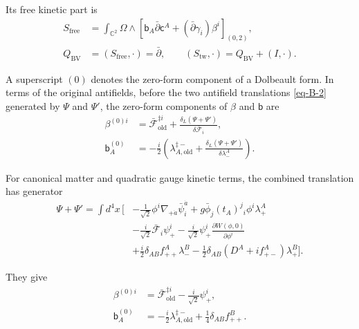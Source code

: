 \documentclass[11pt]{article}
\numberwithin{equation}{section}
\numberwithin{figure}{section}
\numberwithin{table}{section}
\begin{document}
Its free kinetic part is
\begin{equation}\label{eq-BV-free-action}
\begin{aligned}
S_{\mathrm{free}}&=\int_{\mathbb C^2}\Omega\wedge
[\mathsf b_A\bar\partial\mathsf c^A+(\bar\partial\gamma_i)\beta^i]_{(0,2)},\\
Q_{\mathrm{BV}}&=(S_{\mathrm{free}},\cdot)=\bar\partial,
\qquad (S_{\mathrm{tw}},\cdot)=Q_{\mathrm{BV}}+(I,\cdot).
\end{aligned}
\end{equation}

A superscript $(0)$ denotes the zero-form component of a Dolbeault form. In terms of the original antifields, before the two antifield translations \eqref{eq-B-2} generated by $\Psi$ and $\Psi'$, the zero-form components of $\beta$ and $\mathsf b$ are
\begin{equation}\label{eq-B-11}
\begin{aligned}
\beta^{(0)i}
&=\bar{\mathcal F}_{\mathrm{old}}^{\ddagger i}
+\frac{\delta_L(\Psi+\Psi')}{\delta\bar{\mathcal F}_i},\\
\mathsf b_A^{(0)}
&=-\frac i2\left(
\lambda_{A,\mathrm{old}}^{\ddagger-}
+\frac{\delta_L(\Psi+\Psi')}{\delta\lambda_-^A}\right).
\end{aligned}
\end{equation}

For canonical matter and quadratic gauge kinetic terms, the combined translation has generator
\begin{equation}\label{eq-B-12}
\begin{aligned}
\Psi+\Psi'=\int d^4x\,\Big[
&-\frac1{\sqrt2}\phi^i\nabla_{+\dot a}\bar\psi_i^{\dot a}
+g\bar\phi_j(t_A)^j{}_i\phi^i\lambda_+^A\\
&-\frac i{\sqrt2}\bar{\mathcal F}_i\psi_+^i
-\frac i{\sqrt2}\psi_+^i\frac{\partial W(\phi,0)}{\partial\phi^i}\\
&+\frac i2\delta_{AB}f_{++}^A\lambda_-^B
-\frac12\delta_{AB}(D^A+if_{+-}^A)\lambda_+^B\Big].
\end{aligned}
\end{equation}

They give
\begin{equation}\label{eq-B-13}
\begin{aligned}
\beta^{(0)i}
&=\bar{\mathcal F}_{\mathrm{old}}^{\ddagger i}
-\frac i{\sqrt2}\psi_+^i,\\
\mathsf b_A^{(0)}
&
=-\frac i2\lambda_{A,\mathrm{old}}^{\ddagger-}
+\frac14\delta_{AB}f_{++}^B.
\end{aligned}
\end{equation}
\end{document}
